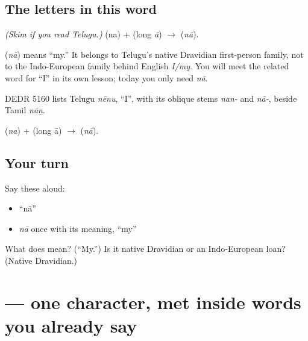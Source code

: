 \subsection*{The letters in this word}
\emph{(Skim if you read Telugu.)} \textbf{} (na) + \textbf{} (long \emph{ā}) $\to$ \textbf{} (\emph{nā}).

\begin{cousinweb}
\textbf{} (\emph{nā}) means \textquotedblleft{}my.\textquotedblright{} It belongs to Telugu's native Dravidian first-person family, not to the Indo-European family behind English \emph{I/my}. You will meet the related word for \textquotedblleft{}I\textquotedblright{} in its own lesson; today you only need \emph{nā}.

DEDR 5160 lists Telugu \emph{nēnu}, \textquotedblleft{}I\textquotedblright{}, with its oblique stems \emph{nan-} and \emph{nā-}, beside Tamil \emph{nāṉ}.
\end{cousinweb}

\begin{sounds}
 (\emph{na}) +  (long ā) $\to$  (\emph{nā}).
\end{sounds}

\subsection*{Your turn}
Say these aloud:

\begin{itemize}
\raggedright
  \item \textquotedblleft{}nā\textquotedblright{}
  \item \emph{nā} once with its meaning, \textquotedblleft{}my\textquotedblright{}
\end{itemize}

\begin{tcolorbox}[breakable,colback=teal!4,colframe=teal!35!black,title={Before you move on}]
What does \textbf{} mean? (\textquotedblleft{}My.\textquotedblright{}) Is it native Dravidian or an Indo-European loan? (Native Dravidian.)
\end{tcolorbox}
\section[\texorpdfstring{\te{ు} (u)}{ు (u)}]{ — one character, met inside words you already say}

\label{lesson:TE-S02-vowel-sign-u}



